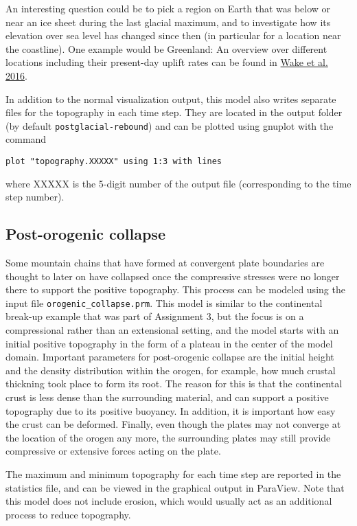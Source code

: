 \documentclass[notitlepage]{article}
\begin{document}
An interesting question could be to pick a region on Earth that was below or near an ice sheet during the last 
glacial maximum, and to investigate how its elevation over sea level has changed since then (in particular for
a location near the coastline). One example would be Greenland: An overview over different locations including their
present-day uplift rates can be found in \href{https://link.springer.com/article/10.1007/s40641-016-0040-z}{Wake et al. 2016}. 

In addition to the normal visualization output, this model also writes separate files for the topography in each time step. 
They are located in the output folder (by default \texttt{postglacial-rebound}) and can be plotted using gnuplot with the command
\begin{verbatim}
plot "topography.XXXXX" using 1:3 with lines
\end{verbatim} 
where XXXXX is the 5-digit number of the output file (corresponding to the time step number). 

\subsection{Post-orogenic collapse}
Some mountain chains that have formed at convergent plate boundaries are thought to later on have collapsed once the compressive stresses were no longer there to support the positive topography. This process can be modeled using the input file \texttt{orogenic\_collapse.prm}. This model is similar to the continental break-up example that was part of Assignment 3, but the focus is on a compressional rather than an extensional setting,  
and the model starts with an initial positive topography in the form of a plateau in the center of the model domain. Important parameters for post-orogenic collapse are the initial height and the density distribution within the orogen, for example, how much crustal thickning took place to form its root. The reason for this is that the continental crust is less dense than the surrounding material, and can support a positive topography due to its positive buoyancy. In addition, it is important how easy the crust can be deformed. 
Finally, even though the plates may not converge at the location of the orogen any more, the surrounding plates may still provide compressive or extensive forces acting on the plate. 

The maximum and minimum topography for each time step are reported in the statistics file, and can be viewed in the graphical output in ParaView. 
Note that this model does not include erosion, which would usually act as an additional process to reduce topography. 
\end{document}
